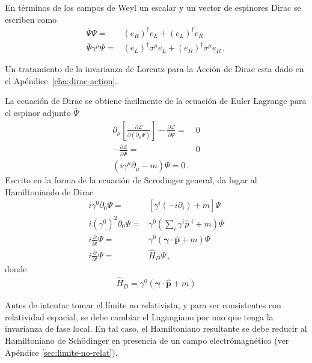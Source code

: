 En términos de los campos de Weyl un escalar y un vector de espinores Dirac se escriben como
\begin{align}
\label{eq:mwd}
  \overline{\Psi}\Psi =& \left( e_R \right)^\dagger e_L+\left( e_L \right)^{\dagger}e_R \nonumber\\
  \overline{\Psi}\gamma^{\mu}\Psi=& (e_L)^{\dagger}\overline{\sigma}^{\mu}e_L+(e_R)^{\dagger}\sigma^{\mu}e_{R}\,,
\end{align}


Un tratamiento de la invarianza de Lorentz para la Acción de Dirac esta dado en el Apéndice~\ref{cha:dirac-action}. 

\begin{frame}
La ecuación de Dirac se obtiene facilmente de la ecuación de Euler Lagrange para el espinor adjunto $\overline{\Psi}$
\begin{align}
  \partial_{\mu}\left[ \frac{\partial\mathcal{L}}{\partial \left( \partial_{\mu} \overline{\Psi} \right)} \right]-\frac{\partial \mathcal{L}}{\partial \overline{\Psi}}=&0 \nonumber\\
-\frac{\partial \mathcal{L}}{\partial \overline{\Psi}}=&0 \nonumber\\
\left( i\gamma^{\mu}\partial_{\mu}-m \right)\Psi=0\,.
\end{align}
Escrito en la forma de la ecuación de Scrodinger general, da lugar al Hamiltoniando de Dirac
\begin{align}
  i\gamma^0 \partial_{0}\Psi=&\left[ \gamma^{i} \left( -i \partial_{i}\right)+m \right]\Psi \nonumber\\
  i \left( \gamma^0 \right)^2 \partial_{0}\Psi=&\gamma^0\left( \sum_i\gamma^{i} \widehat{p}\;^i +m \right)\Psi \nonumber\\
  i \frac{\partial}{\partial t}\Psi=&\gamma^0\left( \boldsymbol{\gamma}\cdot \widehat{\mathbf{p}} +m \right)\Psi \nonumber\\
  i \frac{\partial}{\partial t}\Psi=&\widehat{H}_D\Psi\,,
\end{align}
donde
\begin{align}
  \widehat{H}_D=\gamma^0\left( \boldsymbol{\gamma}\cdot \widehat{\mathbf{p}} +m \right)
\end{align}
\end{frame}
Antes de intentar tomar el límite no relativista, y para ser consistentes con relatividad espacial, se debe cambiar el Lagangiano por uno que tenga la invarianza de fase local. En tal caso, el Hamiltoniano resultante se debe reducir al Hamiltoniano de  Sch\"odinger en presencia de un campo electrómagnético (ver Apéndice \ref{sec:limite-no-relat}).

